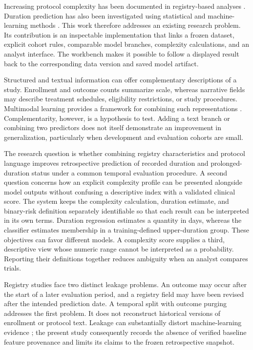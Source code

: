 \documentclass[10pt,letterpaper,twocolumn]{article}
\begin{document}
Increasing protocol complexity has been documented in registry-based analyses \cite{markey}. Duration prediction has also been investigated using statistical and machine-learning methods \cite{cho}. This work therefore addresses an existing research problem. Its contribution is an inspectable implementation that links a frozen dataset, explicit cohort rules, comparable model branches, complexity calculations, and an analyst interface. The workbench makes it possible to follow a displayed result back to the corresponding data version and saved model artifact.

Structured and textual information can offer complementary descriptions of a study. Enrollment and outcome counts summarize scale, whereas narrative fields may describe treatment schedules, eligibility restrictions, or study procedures. Multimodal learning provides a framework for combining such representations \cite{multimodal}. Complementarity, however, is a hypothesis to test. Adding a text branch or combining two predictors does not itself demonstrate an improvement in generalization, particularly when development and evaluation cohorts are small.

The research question is whether combining registry characteristics and protocol language improves retrospective prediction of recorded duration and prolonged-duration status under a common temporal evaluation procedure. A second question concerns how an explicit complexity profile can be presented alongside model outputs without confusing a descriptive index with a validated clinical score. The system keeps the complexity calculation, duration estimate, and binary-risk definition separately identifiable so that each result can be interpreted in its own terms. Duration regression estimates a quantity in days, whereas the classifier estimates membership in a training-defined upper-duration group. These objectives can favor different models. A complexity score supplies a third, descriptive view whose numeric range cannot be interpreted as a probability. Reporting their definitions together reduces ambiguity when an analyst compares trials.

Registry studies face two distinct leakage problems. An outcome may occur after the start of a later evaluation period, and a registry field may have been revised after the intended prediction date. A temporal split with outcome purging addresses the first problem. It does not reconstruct historical versions of enrollment or protocol text. Leakage can substantially distort machine-learning evidence \cite{leakage}; the present study consequently records the absence of verified baseline feature provenance and limits its claims to the frozen retrospective snapshot.
\end{document}

